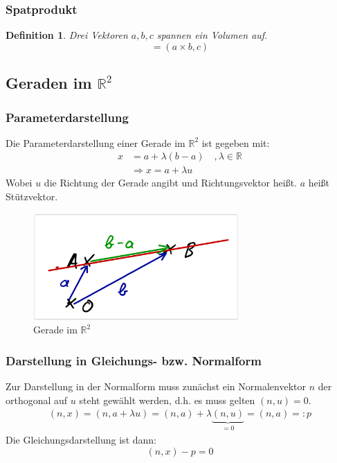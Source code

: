 \documentclass[12pt,a4paper]{report}%
\newtheorem{definition}[satz]{Definition}
\numberwithin{equation}{section}
\newcommand{\R}{\mathbb{R}} %
\numberwithin{equation}{subsection}
\begin{document}
  \subsubsection{Spatprodukt}
  \begin{definition}
    Drei Vektoren $a,b,c$ spannen ein Volumen auf.
    \begin{equation}
      [a,b,c] = (a \times b, c)
    \end{equation}
  \end{definition}
  
  \subsection{Geraden im $\R^2$}
	  \subsubsection{Parameterdarstellung}
	  Die Parameterdarstellung einer Gerade im $\R^2$ ist gegeben mit:
	  \begin{align}
	    x &= a + \lambda(b-a)\quad, \lambda \in \R \nonumber \\
	    &\Rightarrow x = a + \lambda u
	  \end{align}
	  Wobei $u$ die Richtung der Gerade angibt und Richtungsvektor heißt. $a$ heißt Stützvektor.
	  \begin{figure}[htbp] 
		  \centering
		  \includegraphics[width=0.7\textwidth]{Geraden.png}
		  \caption{Gerade im $\R^2$\protect\cite{HM12}}
		  \label{fig:gerade_R2}
	  \end{figure}

    \subsubsection{Darstellung in Gleichungs- bzw. Normalform}
    Zur Darstellung in der Normalform muss zunächst ein Normalenvektor $n$ der orthogonal auf $u$ steht gewählt werden, d.h. es muss gelten $(n,u) = 0$.
    \begin{align}
      (n,x) = (n,a + \lambda u) = (n,a) + \lambda \underbrace{(n,u)}_{=0} = (n,a) =: p
    \end{align}
    Die Gleichungsdarstellung ist dann:
    \begin{equation}
      (n,x)-p = 0 
    \end{equation}
\end{document}
